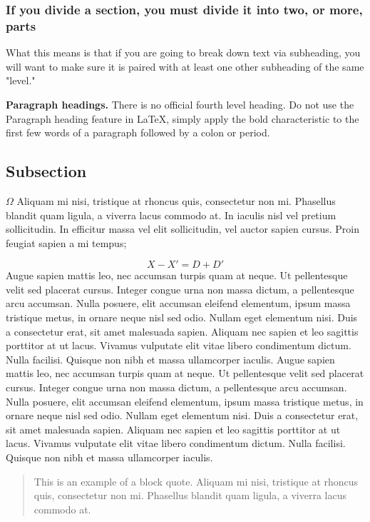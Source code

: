 {\subsubsection{If you divide a section, you must divide it into two, or more, parts}
What this means is that if you are going to break down text via subheading, you will want to make sure it is paired with at least one other subheading of the same "level." 

{\bf Paragraph headings.} There is no official fourth level heading. Do not use the Paragraph heading feature in LaTeX, simply apply the bold characteristic to the first few words of a paragraph followed by a colon or period.

\subsection{Subsection}

\(\Omega\) Aliquam mi nisi, tristique at rhoncus quis, consectetur non mi. Phasellus blandit quam ligula, a viverra lacus commodo at. In iaculis nisl vel pretium sollicitudin. In efficitur massa vel elit sollicitudin, vel auctor sapien cursus. Proin feugiat sapien a mi tempus;

\begin{equation}
       X-X'=D+D' 
\end{equation}
Augue sapien mattis leo, nec accumsan turpis quam at neque. Ut pellentesque velit sed
placerat cursus. Integer congue urna non massa dictum, a pellentesque arcu accumsan. Nulla
posuere, elit accumsan eleifend elementum, ipsum massa tristique metus, in ornare neque nisl sed
odio. Nullam eget elementum nisi. Duis a consectetur erat, sit amet malesuada sapien. Aliquam
nec sapien et leo sagittis porttitor at ut lacus. Vivamus vulputate elit vitae libero condimentum
dictum. Nulla facilisi. Quisque non nibh et massa ullamcorper iaculis.
Augue sapien mattis leo, nec accumsan turpis quam at neque. Ut pellentesque velit sed
placerat cursus. Integer congue urna non massa dictum, a pellentesque arcu accumsan. Nulla
posuere, elit accumsan eleifend elementum, ipsum massa tristique metus, in ornare neque nisl sed
odio. Nullam eget elementum nisi. Duis a consectetur erat, sit amet malesuada sapien. Aliquam
nec sapien et leo sagittis porttitor at ut lacus. Vivamus vulputate elit vitae libero condimentum
dictum. Nulla facilisi. Quisque non nibh et massa ullamcorper iaculis.


\begin{quote}
    \begin{singlespace}
  This is an example of a block quote. Aliquam mi nisi, tristique at rhoncus quis, consectetur non mi. Phasellus blandit quam ligula, a viverra lacus commodo at. 
    \end{singlespace}
    

\end{quote}}
